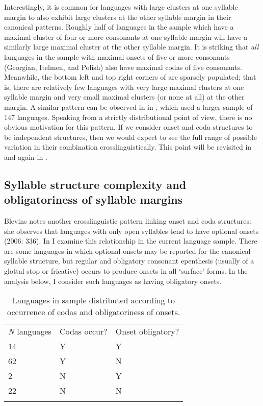  Interestingly, it is common for languages with large clusters at one syllable margin to also exhibit large clusters at the other syllable margin in their canonical patterns. Roughly half of languages in the sample which have a maximal cluster of four or more consonants at one syllable margin will have a similarly large maximal cluster at the other syllable margin. It is striking that \textit{all} languages in the sample with maximal onsets of five or more consonants (Georgian, Itelmen, and Polish) also have maximal codas of five consonants. Meanwhile, the bottom left and top right corners of  are sparsely populated; that is, there are relatively few languages with very large maximal clusters at one syllable margin and very small maximal clusters (or none at all) at the other margin. A similar pattern can be observed in  in , which used a larger sample of 147 languages. Speaking from a strictly distributional point of view, there is no obvious motivation for this pattern. If we consider onset and coda structures to be independent structures, then we would expect to see the full range of possible variation in their combination crosslinguistically. This point will be revisited in  and again in .

\subsection{Syllable structure complexity and obligatoriness of syllable margins}\label{sec:3.3.3}

  Blevins notes another crosslinguistic pattern linking onset and coda structures: she observes that languages with only open syllables tend to have optional onsets (2006: 336). In  I examine this relationship in the current language sample. There are some languages in which optional onsets may be reported for the canonical syllable structure, but regular and obligatory consonant epenthesis (usually of a glottal stop or fricative) occurs to produce onsets in all ‘surface’ forms. In the analysis below, I consider such languages as having obligatory onsets.

\begin{table}
\begin{tabularx}{\textwidth}{XXX}
\lsptoprule

 \textit{N} languages & Codas occur? & Onset obligatory?\\
 14 & Y & Y\\
 62 & Y & N\\
 2 & N & Y\\
 22 & N & N\\
\lspbottomrule
\end{tabularx}
\caption{\label{tab:3.3}Languages in sample distributed according to occurrence of codas and obligatoriness of onsets.}
\end{table}

